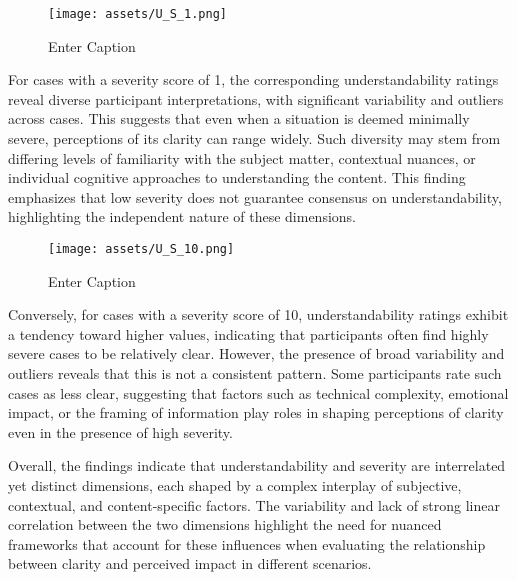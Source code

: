 \begin{figure}
    \centering
    \texttt{[image: assets/U\_S\_1.png]}
    \caption{Enter Caption}
\end{figure}
For cases with a severity score of 1, the corresponding understandability ratings reveal diverse participant interpretations, with significant variability and outliers across cases. This suggests that even when a situation is deemed minimally severe, perceptions of its clarity can range widely. Such diversity may stem from differing levels of familiarity with the subject matter, contextual nuances, or individual cognitive approaches to understanding the content. This finding emphasizes that low severity does not guarantee consensus on understandability, highlighting the independent nature of these dimensions.
\begin{figure}
    \centering
    \texttt{[image: assets/U\_S\_10.png]}
    \caption{Enter Caption}
\end{figure}
Conversely, for cases with a severity score of 10, understandability ratings exhibit a tendency toward higher values, indicating that participants often find highly severe cases to be relatively clear. However, the presence of broad variability and outliers reveals that this is not a consistent pattern. Some participants rate such cases as less clear, suggesting that factors such as technical complexity, emotional impact, or the framing of information play roles in shaping perceptions of clarity even in the presence of high severity.

Overall, the findings indicate that understandability and severity are interrelated yet distinct dimensions, each shaped by a complex interplay of subjective, contextual, and content-specific factors. The variability and lack of strong linear correlation between the two dimensions highlight the need for nuanced frameworks that account for these influences when evaluating the relationship between clarity and perceived impact in different scenarios.
